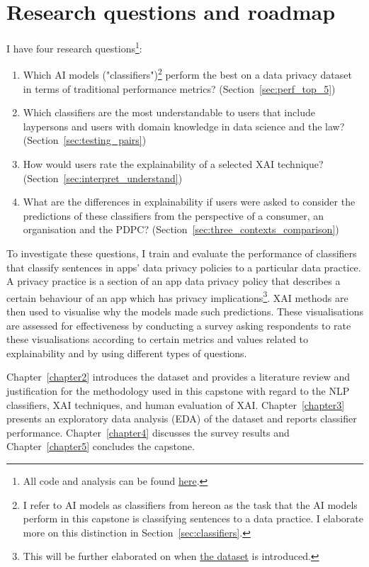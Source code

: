 \section{Research questions and roadmap}
\label{chap1:research_questions}
I have four research questions\footnote{All code and analysis can be found \href{https://github.com/TristanKoh/capstone-repo/}{here}.}: 

\begin{enumerate}
  \item Which AI models ("classifiers")\footnote{I refer to AI models as classifiers from hereon as the task that the AI models perform in this capstone is classifying sentences to a data practice. I elaborate more on this distinction in Section~\ref{sec:classifiers}.} perform the best on a data privacy dataset in terms of traditional performance metrics? (Section~\ref{sec:perf_top_5})
  
  \item Which classifiers are the most understandable to users that include laypersons and users with domain knowledge in data science and the law? (Section~\ref{sec:testing_pairs})
  
  \item How would users rate the explainability of a selected XAI technique? (Section~\ref{sec:interpret_understand})

  \item What are the differences in explainability if users were asked to consider the predictions of these classifiers from the perspective of a consumer, an organisation and the PDPC? (Section~\ref{sec:three_contexts_comparison})
\end{enumerate}

To investigate these questions, I train and evaluate the performance of classifiers that classify sentences in apps' data privacy policies to a particular data practice. A privacy practice is a section of an app data privacy policy that describes a certain behaviour of an app which has privacy implications\footnote{This will be further elaborated on when \hyperref[app350_corpus]{the dataset} is introduced.}. XAI methods are then used to visualise why the models made such predictions. These visualisations are assessed for effectiveness by conducting a survey asking respondents to rate these visualisations according to certain metrics and values related to explainability and by using different types of questions.

Chapter~\ref{chapter2} introduces the dataset and provides a literature review and justification for the methodology used in this capstone with regard to the NLP classifiers, XAI techniques, and human evaluation of XAI. Chapter~\ref{chapter3} presents an exploratory data analysis (EDA) of the dataset and reports classifier performance. Chapter~\ref{chapter4} discusses the survey results and Chapter~\ref{chapter5} concludes the capstone.
